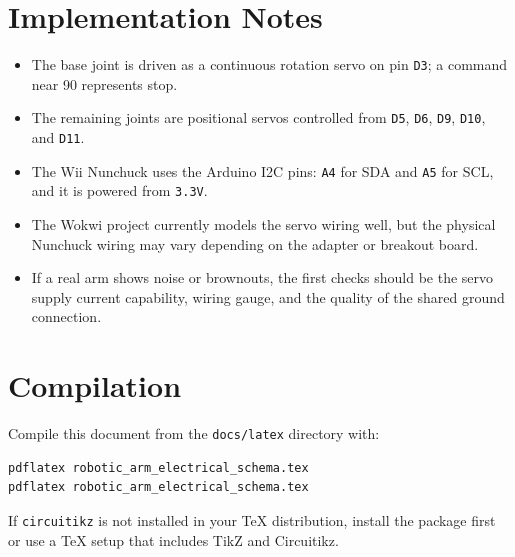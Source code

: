 \documentclass[a4paper,11pt]{article}
\begin{document}
\clearpage

\section{Implementation Notes}

\begin{itemize}
  \item The base joint is driven as a continuous rotation servo on pin
  \texttt{D3}; a command near 90 represents stop.
  \item The remaining joints are positional servos controlled from
  \texttt{D5}, \texttt{D6}, \texttt{D9}, \texttt{D10}, and \texttt{D11}.
  \item The Wii Nunchuck uses the Arduino I2C pins: \texttt{A4} for SDA and
  \texttt{A5} for SCL, and it is powered from \texttt{3.3V}.
  \item The Wokwi project currently models the servo wiring well, but the
  physical Nunchuck wiring may vary depending on the adapter or breakout board.
  \item If a real arm shows noise or brownouts, the first checks should be the
  servo supply current capability, wiring gauge, and the quality of the shared
  ground connection.
\end{itemize}

\section{Compilation}

Compile this document from the \texttt{docs/latex} directory with:

\begin{verbatim}
pdflatex robotic_arm_electrical_schema.tex
pdflatex robotic_arm_electrical_schema.tex
\end{verbatim}

If \texttt{circuitikz} is not installed in your TeX distribution, install the
package first or use a TeX setup that includes TikZ and Circuitikz.
\end{document}

